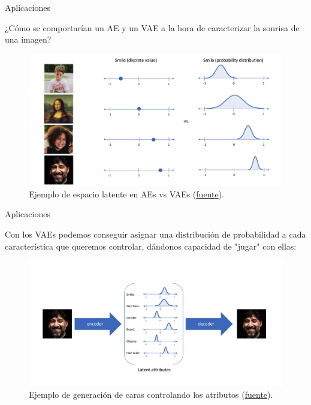 \begin{frame}{Aplicaciones}

¿Cómo se comportarían un AE y un VAE a la hora de caracterizar la sonrisa de una imagen?

\begin{figure}
    \centering
    \includegraphics[width=.7\textwidth]{Slides/figures/02_Metodos_Generativos/vae-face-generator-smile.png}
    \caption{Ejemplo de espacio latente en AEs vs VAEs (\href{https://www.jeremyjordan.me/variational-autoencoders/}{fuente}).}
    \label{fig:enter-label}
\end{figure}
    
\end{frame}

\iffalse

\begin{frame}{Aplicaciones}

Con los VAEs podemos conseguir asignar una distribución de probabilidad a cada característica que queremos controlar, dándonos capacidad de "jugar" con ellas:

\begin{figure}
    \centering
    \includegraphics[width=.8\textwidth]{Slides/figures/02_Metodos_Generativos/vae-face-generator-smile_pds.png}
    \caption{Ejemplo de generación de caras controlando los atributos (\href{https://www.jeremyjordan.me/variational-autoencoders/}{fuente}).}
    \label{fig:enter-label}
\end{figure}
    
\end{frame}

